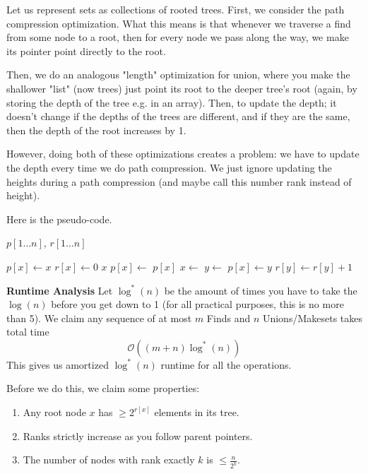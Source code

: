 \begin{algothm}
    Let us represent sets as collections of rooted trees.
    First, we consider the path compression optimization. What this means is that whenever we traverse a find from some node to a root,
    then for every node we pass along the way, we make its pointer point directly to the root.
    
    Then, we do an analogous "length" optimization
    for union, where you make the shallower "list" (now trees) just point its root to the deeper tree's root (again, by storing the depth of the tree e.g.
    in an array). Then, to update the depth; it doesn't change if the depths of the trees are different, and if they are the same,
    then the depth of the root increases by 1.

    However, doing both of these optimizations creates a problem: we have to update the depth every time we do path compression.
    We just ignore updating the heights during a path compression (and maybe call this number rank instead of height).

    Here is the pseudo-code.

    $p[1\dots n]$, $r[1 \dots n]$ 
    \begin{algorithmic}
            \State $p[x] \gets x$
            \State $r[x] \gets 0$
        \EndFunction
            \State \Return $x$
            \EndIf
            \State $p[x] \gets$ 
            \Return $p[x]$
        \EndFunction
            \State $x \gets$ 
            \State $y \gets$ 
                \State \Return
            \EndIf
                \State {}
            \EndIf
            \State $p[x] \gets y$
                \State $r[y] \gets r[y] + 1$
            \EndIf
        \EndFunction
    \end{algorithmic}

    \textbf{Runtime Analysis} Let $\log^*(n)$ be the amount of times you have to take
    the $\log(n)$ before you get down to 1 (for all practical purposes, this is no more than 5).
    We claim any sequence of at most $m$ Finds and $n$ Unions/Makesets takes total time
    \[ \mathcal{O}((m + n) \log^*(n)) \]
    This gives us amortized $\log^*(n)$ runtime for all the operations.

    Before we do this, we claim some properties:
    \begin{enumerate}
        \item Any root node $x$ has $\geq 2^{r[x]}$ elements in its tree.
        \item Ranks strictly increase as you follow parent pointers.
        \item The number of nodes with rank exactly $k$ is $\leq \frac{n}{2^k}$.
    \end{enumerate}


\end{algothm}
